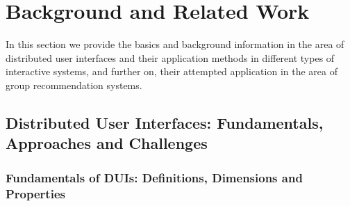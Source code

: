 \chapter{Background and Related Work}\label{chapter:litreview}
In this section we provide the basics and background information in the area of
distributed user interfaces and their application methods in different types of
interactive systems, and further on, their attempted application in the area of
group recommendation systems.
\section{Distributed User Interfaces: Fundamentals, Approaches and Challenges}
\subsection{Fundamentals of DUIs: Definitions, Dimensions and Properties}
